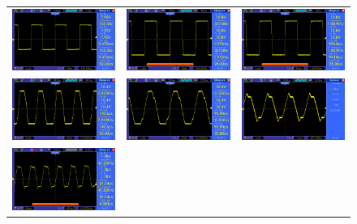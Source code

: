 \documentclass[14pt,a4paper]{extarticle}
\begin{document}
\begin{figure}[ht]
\centering
\begin{tabular}{ccc}
    \includegraphics[width=0.33\linewidth]{imgs/square100.png}&
    \includegraphics[width=0.33\linewidth]{imgs/square500.png}&
    \includegraphics[width=0.33\linewidth]{imgs/square1k.png}\\
    \includegraphics[width=0.33\linewidth]{imgs/square7k.png}&
    \includegraphics[width=0.33\linewidth]{imgs/square10k.png}&        
    \includegraphics[width=0.33\linewidth]{imgs/square30k.png}\\
    \includegraphics[width=0.33\linewidth]{imgs/square47k.png}&

\end{tabular}
\end{figure}
\end{document}
